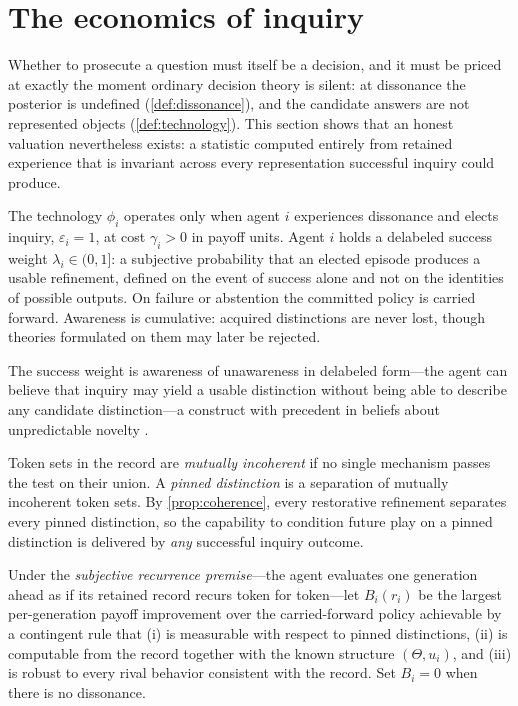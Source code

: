 \section{The economics of inquiry}
\label{sec:economics}

Whether to prosecute a question must itself be a decision, and it must be
priced at exactly the moment ordinary decision theory is silent: at
dissonance the posterior is undefined (\cref{def:dissonance}), and the
candidate answers are not represented objects (\cref{def:technology}).  This
section shows that an honest valuation nevertheless exists: a statistic
computed entirely from retained experience that is invariant across every
representation successful inquiry could produce.

\begin{assumption}
\label{ass:elective}
The technology $\phi_i$ operates only when agent $i$ experiences dissonance
and elects inquiry, $\varepsilon_i=1$, at cost $\gamma_i>0$ in payoff units.
Agent $i$ holds a delabeled success weight $\lambda_i\in(0,1]$: a subjective
probability that an elected episode produces a usable refinement, defined on
the event of success alone and not on the identities of possible outputs.
On failure or abstention the committed policy is carried forward.  Awareness
is cumulative: acquired distinctions are never lost, though theories
formulated on them may later be rejected.
\end{assumption}

The success weight is awareness of unawareness in delabeled form---the agent
can believe that inquiry may yield a usable distinction without being able
to describe any candidate distinction---a construct with precedent in
beliefs about unpredictable novelty \citep{Schipper2025,KarniViero2017}.

\begin{definition}
\label{def:pinned}
Token sets in the record are \emph{mutually incoherent} if no single
mechanism passes the test on their union.  A \emph{pinned distinction} is a
separation of mutually incoherent token sets.  By
\cref{prop:coherence}, every restorative refinement separates every pinned
distinction, so the capability to condition future play on a pinned
distinction is delivered by \emph{any} successful inquiry outcome.
\end{definition}

\begin{definition}
\label{def:leverage}
Under the \emph{subjective recurrence premise}---the agent evaluates one
generation ahead as if its retained record recurs token for token---let
$B_i(r_i)$ be the largest per-generation payoff improvement over the
carried-forward policy achievable by a contingent rule that (i) is
measurable with respect to pinned distinctions, (ii) is computable from the
record together with the known structure $(\Theta,u_i)$, and (iii) is robust
to every rival behavior consistent with the record.  Set $B_i=0$ when there
is no dissonance.
\end{definition}

